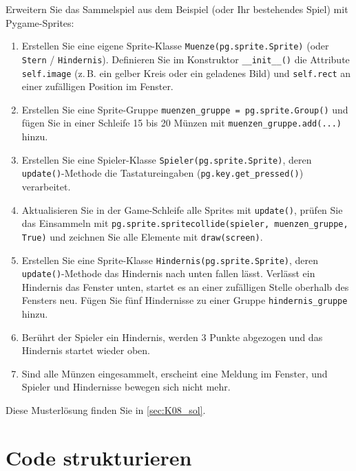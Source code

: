 \begin{myexercise}\label{myexercise:Sprites}
    Erweitern Sie das Sammelspiel aus dem Beispiel (oder Ihr bestehendes Spiel) mit Pygame-Sprites:
    \begin{enumerate}
        \item {\sloppy Erstellen Sie eine eigene Sprite-Klasse \lstinline|Muenze(pg.sprite.Sprite)| (oder \lstinline|Stern| / \lstinline|Hindernis|). Definieren Sie im Konstruktor \lstinline|__init__()| die Attribute \lstinline|self.image| (z.\,B. ein gelber Kreis oder ein geladenes Bild) und \lstinline|self.rect| an einer zufälligen Position im Fenster.\par}
        \item Erstellen Sie eine Sprite-Gruppe \lstinline|muenzen_gruppe = pg.sprite.Group()| und fügen Sie in einer Schleife 15 bis 20 Münzen mit \lstinline|muenzen_gruppe.add(...)| hinzu.
        \item Erstellen Sie eine Spieler-Klasse \lstinline|Spieler(pg.sprite.Sprite)|, deren \lstinline|update()|-Methode die Tastatureingaben (\lstinline|pg.key.get_pressed()|) verarbeitet.
        \item Aktualisieren Sie in der Game-Schleife alle Sprites mit \lstinline|update()|, prüfen Sie das Einsammeln mit \lstinline|pg.sprite.spritecollide(spieler, muenzen_gruppe, True)| und zeichnen Sie alle Elemente mit \lstinline|draw(screen)|.
        \item {\sloppy Erstellen Sie eine Sprite-Klasse \lstinline|Hindernis(pg.sprite.Sprite)|, deren \lstinline|update()|-Methode das Hindernis nach unten fallen lässt. Verlässt ein Hindernis das Fenster unten, startet es an einer zufälligen Stelle oberhalb des Fensters neu. Fügen Sie fünf Hindernisse zu einer Gruppe \lstinline|hindernis_gruppe| hinzu.\par}
        \item Berührt der Spieler ein Hindernis, werden 3 Punkte abgezogen und das Hindernis startet wieder oben.
        \item Sind alle Münzen eingesammelt, erscheint eine Meldung im Fenster, und Spieler und Hindernisse bewegen sich nicht mehr.
    \end{enumerate}
    \begin{myanswer}
        Diese Musterlösung finden Sie in \cref{sec:K08_sol}.
    \end{myanswer}
\end{myexercise}

\section{Code strukturieren}

